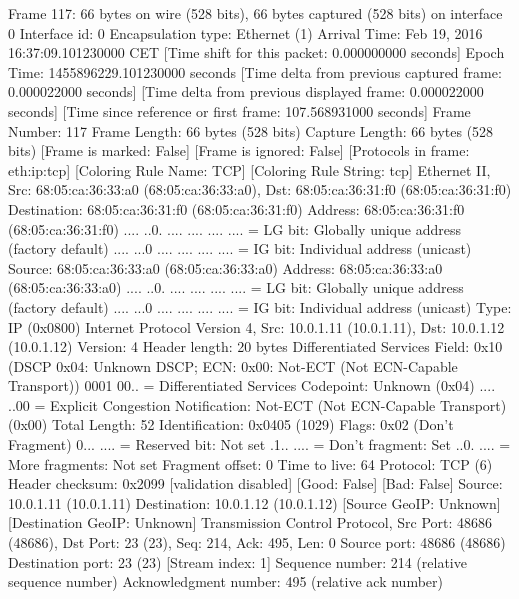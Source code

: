 Frame 117: 66 bytes on wire (528 bits), 66 bytes captured (528 bits) on interface 0
    Interface id: 0
    Encapsulation type: Ethernet (1)
    Arrival Time: Feb 19, 2016 16:37:09.101230000 CET
    [Time shift for this packet: 0.000000000 seconds]
    Epoch Time: 1455896229.101230000 seconds
    [Time delta from previous captured frame: 0.000022000 seconds]
    [Time delta from previous displayed frame: 0.000022000 seconds]
    [Time since reference or first frame: 107.568931000 seconds]
    Frame Number: 117
    Frame Length: 66 bytes (528 bits)
    Capture Length: 66 bytes (528 bits)
    [Frame is marked: False]
    [Frame is ignored: False]
    [Protocols in frame: eth:ip:tcp]
    [Coloring Rule Name: TCP]
    [Coloring Rule String: tcp]
Ethernet II, Src: 68:05:ca:36:33:a0 (68:05:ca:36:33:a0), Dst: 68:05:ca:36:31:f0 (68:05:ca:36:31:f0)
    Destination: 68:05:ca:36:31:f0 (68:05:ca:36:31:f0)
        Address: 68:05:ca:36:31:f0 (68:05:ca:36:31:f0)
        .... ..0. .... .... .... .... = LG bit: Globally unique address (factory default)
        .... ...0 .... .... .... .... = IG bit: Individual address (unicast)
    Source: 68:05:ca:36:33:a0 (68:05:ca:36:33:a0)
        Address: 68:05:ca:36:33:a0 (68:05:ca:36:33:a0)
        .... ..0. .... .... .... .... = LG bit: Globally unique address (factory default)
        .... ...0 .... .... .... .... = IG bit: Individual address (unicast)
    Type: IP (0x0800)
Internet Protocol Version 4, Src: 10.0.1.11 (10.0.1.11), Dst: 10.0.1.12 (10.0.1.12)
    Version: 4
    Header length: 20 bytes
    Differentiated Services Field: 0x10 (DSCP 0x04: Unknown DSCP; ECN: 0x00: Not-ECT (Not ECN-Capable Transport))
        0001 00.. = Differentiated Services Codepoint: Unknown (0x04)
        .... ..00 = Explicit Congestion Notification: Not-ECT (Not ECN-Capable Transport) (0x00)
    Total Length: 52
    Identification: 0x0405 (1029)
    Flags: 0x02 (Don't Fragment)
        0... .... = Reserved bit: Not set
        .1.. .... = Don't fragment: Set
        ..0. .... = More fragments: Not set
    Fragment offset: 0
    Time to live: 64
    Protocol: TCP (6)
    Header checksum: 0x2099 [validation disabled]
        [Good: False]
        [Bad: False]
    Source: 10.0.1.11 (10.0.1.11)
    Destination: 10.0.1.12 (10.0.1.12)
    [Source GeoIP: Unknown]
    [Destination GeoIP: Unknown]
Transmission Control Protocol, Src Port: 48686 (48686), Dst Port: 23 (23), Seq: 214, Ack: 495, Len: 0
    Source port: 48686 (48686)
    Destination port: 23 (23)
    [Stream index: 1]
    Sequence number: 214    (relative sequence number)
    Acknowledgment number: 495    (relative ack number)
